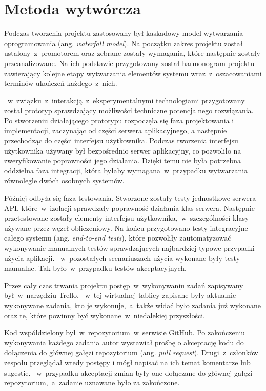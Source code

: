 \documentclass[a4paper,11pt,twoside]{report}
\theoremstyle{definition}
\begin{document}
\section{Metoda wytwórcza}
    \label{metoda-wytworcza}
    
    Podczas tworzenia projektu zastosowany był kaskadowy model wytwarzania oprogramowania (ang. \textit{waterfall model}).
    Na początku zakres projektu został ustalony~z~promotorem oraz zebrane zostały wymagania, które następnie zostały przeanalizowane.
    Na ich podstawie przygotowany został harmonogram projektu zawierający kolejne etapy wytwarzania elementów systemu
    wraz~z~oszacowaniami terminów ukończeń każdego~z~nich.
    
   ~w~związku~z~interakcją~z~eksperymentalnymi technologiami przygotowany został prototyp
    sprawdzający możliwości techniczne potencjalnego rozwiązania.
    Po stworzeniu działającego prototypu rozpoczęła się faza projektowania i implementacji, zaczynając od części serwera aplikacyjnego,
    a następnie przechodząc do części interfejsu użytkownika.
    Podczas tworzenia interfejsu użytkownika używany był bezpośrednio serwer aplikacyjny, co pozwoliło na zweryfikowanie
    poprawności jego działania.
    Dzięki temu nie była potrzebna oddzielna faza integracji, która byłaby wymagana~w~przypadku wytwarzania
    równolegle dwóch osobnych systemów.
    
    Później odbyła się faza testowania.
    Stworzone zostały testy jednostkowe serwera API, które~w~izolacji sprawdzały poprawność działania klas serwera.
    Następnie przetestowane zostały elementy interfejsu użytkownika,~w~szczególności klasy używane przez węzeł obliczeniowy.
    Na końcu przygotowano testy integracyjne całego systemu (ang. \textit{end-to-end tests}),
    które pozwoliły zautomatyzować wykonywanie manualnych testów sprawdzających najbardziej typowe przypadki
    użycia aplikacji.
   ~w~pozostałych scenariuszach użycia wykonane były testy manualne.
    Tak było~w~przypadku testów akceptacyjnych.
    
    Przez cały czas trwania projektu postęp~w~wykonywaniu zadań zapisywany był~w~narzędziu Trello.
   ~w~tej wirtualnej tablicy zapisane były aktualnie wykonywane zadania, kto je wykonuje,~a~także
    widać było zadania już wykonane oraz te, które powinny być wykonane~w~niedalekiej przyszłości.
    
    Kod współdzielony był~w~repozytorium~w~serwisie GitHub.
    Po zakończeniu wykonywania każdego zadania autor wystawiał prośbę o akceptację kodu do dołączenia
    do głównej gałęzi repozytorium (ang. \textit{pull request}).
    Drugi~z~członków zespołu przeglądał wtedy postępy i mógł napisać na ich temat komentarze lub sugestie.
   ~w~przypadku akceptacji zmian były one dołączane do głównej gałęzi repozytorium,~a~zadanie uznawane było
    za zakończone.
    
\end{document}
